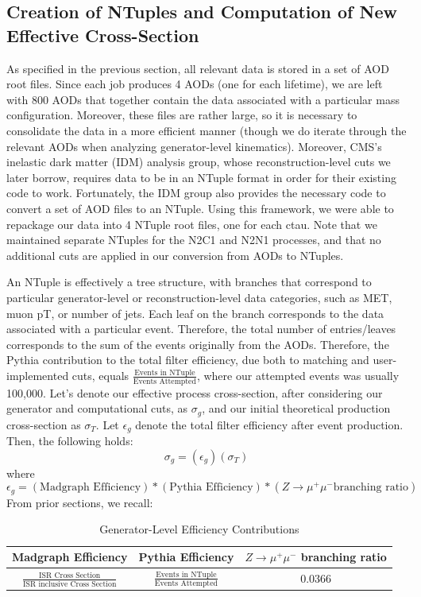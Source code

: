 \documentclass{article}
\begin{document}
\subsection{Creation of NTuples and Computation of New Effective Cross-Section}
As specified in the previous section, all relevant data is stored in a set of AOD root files. Since each job produces 4 AODs (one for each lifetime), we are left with 800 AODs that together contain the data associated with a particular mass configuration. Moreover, these files are rather large, so it is necessary to consolidate the data in a more efficient manner (though we do iterate through the relevant AODs when analyzing generator-level kinematics).  Moreover, CMS's inelastic dark matter (IDM) analysis group, whose reconstruction-level cuts we later borrow, requires data to be in an NTuple format in order for their existing code to work. Fortunately, the IDM group also provides the necessary code to convert a set of AOD files to an NTuple. Using this framework, we were able to repackage our data into 4 NTuple root files, one for each ctau. Note that we maintained separate NTuples for the N2C1 and N2N1 processes, and that no additional cuts are applied in our conversion from AODs to NTuples.
\par
An NTuple is effectively a tree structure, with branches that correspond to particular generator-level or reconstruction-level data categories, such as MET, muon pT, or number of jets. Each leaf on the branch corresponds to the data associated with a particular event. Therefore, the total number of entries/leaves corresponds to the sum of the events originally from the AODs. Therefore, the Pythia contribution to the total filter efficiency, due both to matching and user-implemented cuts, equals $\frac{\text{Events in NTuple}}{\text{Events Attempted}}$, where our attempted events was usually 100,000. Let's denote our effective process cross-section, after considering our generator and computational cuts, as $\sigma_{g}$, and our initial theoretical production cross-section as $\sigma_{T}$. Let $\epsilon_{g}$ denote the total filter efficiency after event production. Then, the following holds:
\[\sigma_{g} = (\epsilon_{g})(\sigma_{T})\]
where
\[\epsilon_{g} = (\text{Madgraph Efficiency})*(\text{Pythia Efficiency})*(Z\rightarrow \mu^{+}\mu^{-} \text{branching ratio})\]
From prior sections, we recall:
\begin{centering}
    \begin{table}[h]
        \begin{tabular}{||c|c|c||}
        \hline Madgraph Efficiency & Pythia Efficiency & $Z\rightarrow \mu^{+}\mu^{-}$ branching ratio \\
        \hline
        $\frac{\text{ISR Cross Section}}{\text{ISR inclusive Cross Section}}$ & $\frac{\text{Events in NTuple}}{\text{Events Attempted}}$ & 0.0366 \\
        \hline
        \end{tabular}
        \label{table:3}
        \caption{Generator-Level Efficiency Contributions}
    \end{table}
\end{centering}
\end{document}
